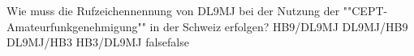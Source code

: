     {Wie muss die Rufzeichennennung von DL9MJ bei der Nutzung der ""CEPT-Amateurfunkgenehmigung"" in der Schweiz erfolgen?}
    {HB9/DL9MJ}
    {DL9MJ/HB9}
    {DL9MJ/HB3}
    {HB3/DL9MJ}
    {false}{false}